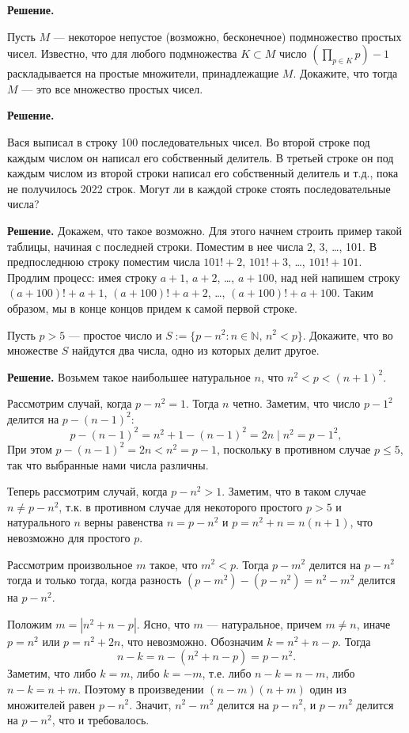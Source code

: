 \textbf{Решение.}


Пусть $M$ — некоторое непустое (возможно, бесконечное) подмножество простых чисел. Известно, что для любого подмножества $K\subset M$ число $(\prod_{p\in K} p )- 1$ раскладывается на простые множители, принадлежащие $M$. Докажите, что тогда $M$ — это все множество простых чисел.

\textbf{Решение.}


Вася выписал в строку 100 последовательных чисел. Во второй строке под каждым числом он написал его собственный делитель. В третьей строке он под каждым числом из второй строки написал его собственный делитель и т.д., пока не получилось 2022 строк. Могут ли в каждой строке стоять последовательные числа?

\textbf{Решение.}
Докажем, что такое возможно. Для этого начнем строить пример такой таблицы, начиная с последней строки. Поместим в нее числа 2, 3, …, 101. В предпоследнюю строку поместим числа $101!+2$, $101!+3$, …, $101!+101$. Продлим процесс: имея строку $a+1$, $a+2$, …, $a+100$, над ней напишем строку $(a+100)!+a+1$, $(a+100)!+a+2$, …, $(a+100)!+a+100$. Таким образом, мы в конце концов придем к самой первой строке.


Пусть $p > 5$ — простое число и $S:=\{p - n^2 \colon n \in \mathbb{N}, \, n^2 < p\}$. Докажите, что во множестве $S$ найдутся два числа, одно из которых делит другое.

\textbf{Решение.}
Возьмем такое наибольшее натуральное $n$, что $n^2 < p < (n + 1)^2$.

Рассмотрим случай, когда $p - n^2 = 1$. Тогда $n$ четно. Заметим, что
число $p - 1^2$ делится на $p - (n - 1)^2$:
$$p - (n - 1)^2 = n^2 + 1 - (n - 1)^2 = 2n\mid n^2=p-1^2,$$ При этом
$p - (n - 1)^2 = 2n < n^2 = p - 1$, поскольку в противном случае
$p \leqslant 5$, так что выбранные нами числа различны.

Теперь рассмотрим случай, когда $p - n^2 > 1$. Заметим, что в таком
случае $n \neq p - n^2$, т.к. в противном случае для некоторого простого
$p > 5$ и натурального $n$ верны равенства $n = p - n^2$ и
$p = n^2 + n = n(n + 1)$, что невозможно для простого $p$.

Рассмотрим произвольное $m$ такое, что $m^2 < p$. Тогда $p - m^2$
делится на $p - n^2$ тогда и только тогда, когда разность
$(p - m^2) - (p - n^2)=n^2-m^2$ делится на $p - n^2$.

Положим $m= | n^2 + n - p |$. Ясно, что $m$ — натуральное, причем
$m\neq n$, иначе $p=n^2$ или $p=n^2+2n$, что невозможно. Обозначим
$k = n^2 + n - p$. Тогда $$n - k = n - (n^2 + n - p) = p - n^2.$$
Заметим, что либо $k =  m$, либо $k = -m$, т.е. либо $n - k = n - m$,
либо $n - k = n + m$. Поэтому в произведении $(n - m)(n + m)$ один из
множителей равен $p - n^2$. Значит, $n^2 - m^2$ делится на $p- n^2$, и
$p - m^2$ делится на $p - n^2$, что и требовалось.

